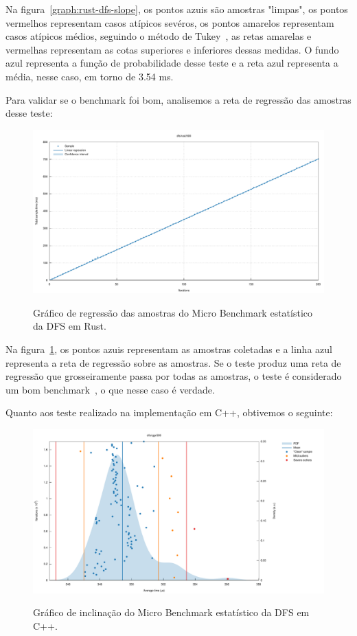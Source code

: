 Na figura~\ref{graph:rust-dfs-slope}, os pontos azuis são amostras
"limpas", os pontos vermelhos representam casos atípicos sevéros, os
pontos amarelos representam casos atípicos médios, seguindo o método de
Tukey~\citep{criterionrust}, as retas amarelas e vermelhas
representam as cotas superiores e inferiores dessas medidas. O fundo
azul representa a função de probabilidade desse teste e a reta azul
representa a média, nesse caso, em torno de 3.54 ms.

Para validar se o benchmark foi bom, analisemos a reta de regressão
das amostras desse teste:

\begin{figure}[!ht]
  \centering
  \caption{Gráfico de regressão das amostras do Micro Benchmark
  estatístico da DFS em Rust.}
  \includegraphics[width=\textwidth]{figures/rust-dfs-500-regression.pdf}
  \label{graph:rust-dfs-regression}
\end{figure}
\FloatBarrier

Na figura~\ref{graph:rust-dfs-regression}, os pontos azuis
representam as amostras coletadas e a linha azul representa a reta de
regressão sobre as amostras. Se o teste produz uma reta de regressão
que grosseiramente passa por todas as amostras, o teste é considerado
um bom benchmark~\citep{criterionrust}, o que nesse caso é verdade.

Quanto aos teste realizado na implementação em C++, obtivemos o seguinte:

\begin{figure}[!ht]
  \centering
  \caption{Gráfico de inclinação do Micro Benchmark estatístico da DFS em C++.}
  \includegraphics[width=\textwidth]{figures/cpp-dfs-500.pdf}
  \label{graph:cpp-dfs-slope}
\end{figure}
\FloatBarrier

